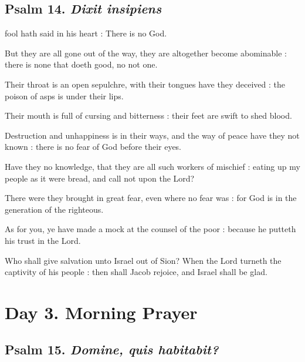 \subsection{Psalm 14. \textit{Dixit insipiens}}

 fool hath said in his heart : There is no God.\par
{}
But they are all gone out of the way, they are altogether become abominable : there is none that doeth good, no not one.\par
{}Their throat is an open sepulchre, with their tongues have they deceived : the poison of asps is under their lips.\par
{}Their mouth is full of cursing and bitterness : their feet are swift to shed blood.\par
{}Destruction and unhappiness is in their ways, and the way of peace have they not known : there is no fear of God before their eyes.\par
{}Have they no knowledge, that they are all such workers of mischief : eating up my people as it were bread, and call not upon the Lord?\par
{}There were they brought in great fear, even where no fear was : for God is in the generation of the righteous.\par
{}As for you, ye have made a mock at the counsel of the poor : because he putteth his trust in the Lord.\par
{}Who shall give salvation unto Israel out of Sion? When the Lord turneth the captivity of his people : then shall Jacob rejoice, and Israel shall be glad.\par

\clearpage
\section*{Day 3. Morning Prayer}

\vspace{-0.25\baselineskip}

\subsection{Psalm 15. \textit{Domine, quis habitabit?}}

